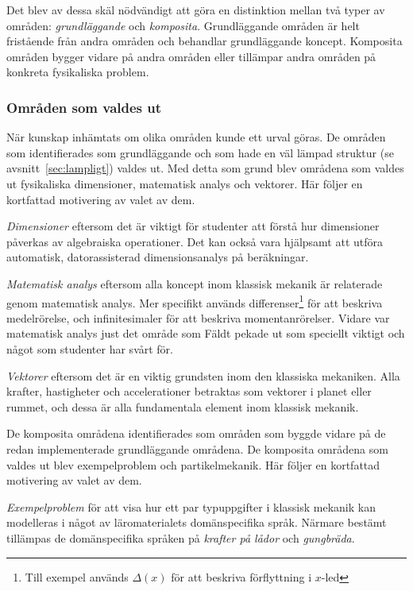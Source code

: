 Det blev av dessa skäl nödvändigt att göra en distinktion mellan två typer av
områden: \textit{grundläggande} och \textit{komposita}. Grundläggande områden är
helt fristående från andra områden och behandlar grundläggande koncept.
Komposita områden bygger vidare på andra områden eller tillämpar andra områden
på konkreta fysikaliska problem.

\subsubsection*{Områden som valdes ut}

När kunskap inhämtats om olika områden kunde ett urval göras. De områden som
identifierades som grundläggande och som hade en väl lämpad struktur (se
avsnitt~\ref{sec:lampligt}) valdes ut. Med detta som grund blev områdena som valdes ut fysikaliska dimensioner, matematisk analys och vektorer. Här följer en kortfattad motivering av valet av dem.

\textit{Dimensioner} eftersom det är viktigt för studenter att förstå
hur dimensioner påverkas av algebraiska operationer. Det kan också vara
hjälpsamt att utföra automatisk, datorassisterad dimensionsanalys på
beräkningar.

\textit{Matematisk analys} eftersom alla koncept inom klassisk mekanik är
relaterade genom matematisk analys. Mer specifikt används
differenser\footnote{Till exempel används $\Delta(x)$ för att beskriva
förflyttning i $x$-led} för att beskriva medelrörelse, och infinitesimaler
för att beskriva momentanrörelser. Vidare var matematisk analys just det
område som Fäldt pekade ut som speciellt viktigt och något som studenter har
svårt för.

\textit{Vektorer} eftersom det är en viktig grundsten inom den klassiska
mekaniken. Alla krafter, hastigheter och accelerationer betraktas som vektorer i
planet eller rummet, och dessa är alla fundamentala element inom klassisk
mekanik.

De komposita områdena identifierades som områden som byggde vidare på de redan
implementerade grundläggande områdena. De komposita områdena som valdes ut
blev exempelproblem och partikelmekanik. Här följer en kortfattad motivering av valet av dem.

\textit{Exempelproblem} för att visa hur ett par typuppgifter i klassisk mekanik kan modelleras i något av läromaterialets domänspecifika språk. Närmare bestämt tillämpas de domänspecifika språken på \textit{krafter på lådor} och \textit{gungbräda}.

